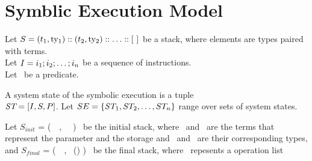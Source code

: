 \documentclass[a4paper,UKenglish]{dagrep-v2021}
\begin{document}
\section{Symblic Execution Model}
\label{sec:symblic-execution-model}

Let $\STACK = (\TermOne, \TYF) \STACKCONCAT (\TermTwo, \TYS) \STACKCONCAT \DOT
\STACKCONCAT \EMPTYSTACK$ be a stack, where elements are types paired with terms.
\\
Let $I = i_1; i_2; \dots; i_n$ be a sequence of instructions. 
\\
Let \PREDICATE\ be a predicate. 

\begin{definition}
A system state of the symbolic execution is a tuple \\ $\textit{ST} = [I, S, P]$. Let $\text{$SE$} = \{\textit{ST}_1, \text{$ST_2$}, \dots, \text{$ST_n$} \}$ range over sets of system states.
\end{definition}

Let $S_{init}$   = (\KPAIR\ \VPAR\ \VSTORAGE, \TPAIR\ \TYF\ \TYS) \STACKCONCAT\EMPTYSTACK\ be the initial  stack, where \VPAR\ and \VSTORAGE\ are the terms that represent the parameter and the storage and \TYF\ and \TYS\ are their corresponding types, and  $S_{final}$   = (\PAIR\ \VOPERATIONLIST\ \VSTORAGE, \TPAIR\ (\TOPERATIONLIST) \TYS) \STACKCONCAT\EMPTYSTACK\ be  the final stack, where \VOPERATIONLIST\ repesents a operation list
\end{document}
